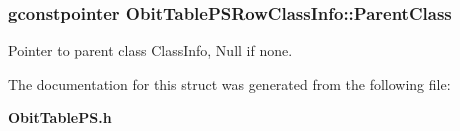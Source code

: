 \subsubsection{\setlength{\rightskip}{0pt plus 5cm}gconstpointer {\bf Obit\-Table\-PSRow\-Class\-Info::Parent\-Class}}\label{structObitTablePSRowClassInfo_o3}


Pointer to parent class Class\-Info, Null if none. 



The documentation for this struct was generated from the following file:\begin{CompactItemize}
\item 
{\bf Obit\-Table\-PS.h}\end{CompactItemize}
